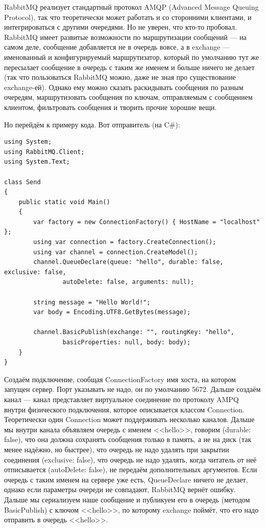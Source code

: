 \documentclass[a5paper]{article}
\begin{document}
RabbitMQ реализует стандартный протокол AMQP (Advanced Message Queuing Protocol), так что теоретически может работать и со сторонними клиентами, и интегрироваться с другими очередями. Но не уверен, что кто-то пробовал. RabbitMQ имеет развитые возможности по маршрутизации сообщений --- на самом деле, сообщение добавляется не в очередь вовсе, а в exchange --- именованный и конфигурируемый маршрутизатор, который по умолчанию тут же пересылает сообщение в очередь с таким же именем и больше ничего не делает (так что пользоваться RabbitMQ можно, даже не зная про существование exchange-ей). Однако ему можно сказать раскидывать сообщения по разным очередям, маршрутизовать сообщения по ключам, отправляемым с сообщением клиентом, фильтровать сообщения и творить прочие хорошие вещи.

Но перейдём к примеру кода. Вот отправитель (на C\#):

\begin{verbatim}
using System;
using RabbitMQ.Client;
using System.Text;

class Send
{
    public static void Main()
    {
        var factory = new ConnectionFactory() { HostName = "localhost" };
        using var connection = factory.CreateConnection();
        using var channel = connection.CreateModel();
        channel.QueueDeclare(queue: "hello", durable: false, exclusive: false,
                autoDelete: false, arguments: null);

        string message = "Hello World!";
        var body = Encoding.UTF8.GetBytes(message);

        channel.BasicPublish(exchange: "", routingKey: "hello",
                basicProperties: null, body: body);
    }
}
\end{verbatim}

Создаём подключение, сообщая ConnectionFactory имя хоста, на котором запущен сервер. Порт указывать не надо, он по умолчанию 5672. Дальше создаём канал --- канал представляет виртуальное соединение по протоколу AMPQ внутри физического подключения, которое описывается классом Connection. Теоретически один Connection может поддерживать несколько каналов. Дальше мы внутри канала объявляем очередь с именем <<hello>>, говорим (durable: false), что она должна сохранять сообщения только в память, а не на диск (так менее надёжно, но быстрее), что очередь не надо удалять при закрытии соединения (exclusive: false), что очередь не надо удалять, когда читатель от неё отписывается (autoDelete: false), не передаём дополнительных аргументов. Если очередь с таким именем на сервере уже есть, QueueDeclare ничего не делает, однако если параметры очереди не совпадают, RabbitMQ вернёт ошибку. Дальше мы сериализуем наше сообщение и публикуем его в очередь (методом BasicPublish) с ключом <<hello>>, по которому exchange поймёт, что его надо отправить в очередь <<hello>>.
\end{document}

